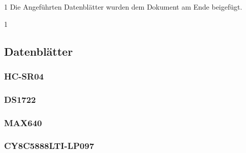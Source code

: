 \documentclass[12pt,a4paper]{article}
\def\datasheets{0}
\begin{document}
\if\datasheets1
	Die Angeführten Datenblätter wurden dem Dokument am Ende beigefügt.
\fi

\if\datasheets1
\subsection{Datenblätter}

	\subsubsection{HC-SR04}
	

	\subsubsection{DS1722}
	

	\subsubsection{MAX640}
	

	\subsubsection{CY8C5888LTI-LP097}
	

\fi %
\end{document}
